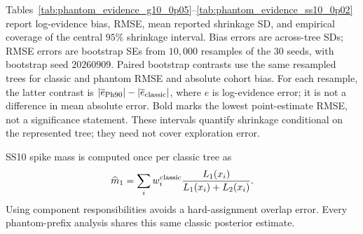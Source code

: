\documentclass[pdflatex,sn-basic,icol]{sn-jnl}
\theoremstyle{plain}
\theoremstyle{definition}
\begin{document}
Tables~\ref{tab:phantom_evidence_g10_0p05}--\ref{tab:phantom_evidence_ss10_0p02} report log-evidence bias, RMSE, mean reported shrinkage SD, and empirical coverage of the central $95\%$ shrinkage interval.
Bias errors are across-tree SDs; RMSE errors are bootstrap SEs from $10{,}000$ resamples of the $30$ seeds, with bootstrap seed $20260909$.
Paired bootstrap contrasts use the same resampled trees for classic and phantom RMSE and absolute cohort bias.
For each resample, the latter contrast is $|\overline e_{\rm Ph90}|-|\overline e_{\rm classic}|$, where $e$ is log-evidence error; it is not a difference in mean absolute error.
Bold marks the lowest point-estimate RMSE, not a significance statement.
These intervals quantify shrinkage conditional on the represented tree; they need not cover exploration error.

SS10 spike mass is computed once per classic tree as
\begin{align}
    \widehat m_1=\sum_i w_i^{\rm classic}
       \frac{L_1(x_i)}{L_1(x_i)+L_2(x_i)}.
\end{align}
Using component responsibilities avoids a hard-assignment overlap error.
Every phantom-prefix analysis shares this same classic posterior estimate.
\end{document}
